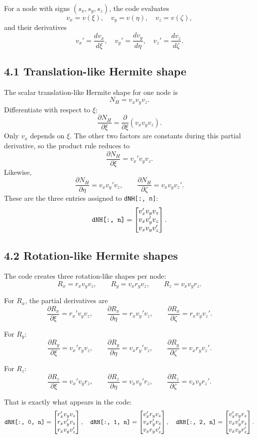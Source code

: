 \documentclass[11pt]{article}
\newcommand{\pd}[2]{\frac{\partial #1}{\partial #2}}
\newcommand{\od}[2]{\frac{d #1}{d #2}}
\begin{document}
For a node with signs $(s_x,s_y,s_z)$, the code evaluates
\[
v_x=v(\xi),\quad v_y=v(\eta),\quad v_z=v(\zeta),
\]
and their derivatives
\[
v_x'=\od{v_x}{\xi},\quad
v_y'=\od{v_y}{\eta},\quad
v_z'=\od{v_z}{\zeta}.
\]

\subsection*{4.1 Translation-like Hermite shape}

The scalar translation-like Hermite shape for one node is
\[
N_H=v_xv_yv_z.
\]
Differentiate with respect to $\xi$:
\[
\pd{N_H}{\xi}
=
\pd{}{\xi}(v_xv_yv_z).
\]
Only $v_x$ depends on $\xi$. The other two factors are constants during this
partial derivative, so the product rule reduces to
\[
\boxed{
\pd{N_H}{\xi}=v_x'v_yv_z
}.
\]
Likewise,
\[
\boxed{
\pd{N_H}{\eta}=v_xv_y'v_z
},
\qquad
\boxed{
\pd{N_H}{\zeta}=v_xv_yv_z'
}.
\]
These are the three entries assigned to \texttt{dNH[:, n]}:
\[
\text{\texttt{dNH[:, n]}}=
\begin{bmatrix}
v_x'v_yv_z\\
v_xv_y'v_z\\
v_xv_yv_z'
\end{bmatrix}.
\]

\subsection*{4.2 Rotation-like Hermite shapes}

The code creates three rotation-like shapes per node:
\[
R_x=r_xv_yv_z,\qquad
R_y=v_xr_yv_z,\qquad
R_z=v_xv_yr_z.
\]

For $R_x$, the partial derivatives are
\[
\boxed{
\pd{R_x}{\xi}=r_x'v_yv_z
},
\qquad
\boxed{
\pd{R_x}{\eta}=r_xv_y'v_z
},
\qquad
\boxed{
\pd{R_x}{\zeta}=r_xv_yv_z'
}.
\]

For $R_y$:
\[
\boxed{
\pd{R_y}{\xi}=v_x'r_yv_z
},
\qquad
\boxed{
\pd{R_y}{\eta}=v_xr_y'v_z
},
\qquad
\boxed{
\pd{R_y}{\zeta}=v_xr_yv_z'
}.
\]

For $R_z$:
\[
\boxed{
\pd{R_z}{\xi}=v_x'v_yr_z
},
\qquad
\boxed{
\pd{R_z}{\eta}=v_xv_y'r_z
},
\qquad
\boxed{
\pd{R_z}{\zeta}=v_xv_yr_z'
}.
\]

That is exactly what appears in the code:
\[
\text{\texttt{dRH[:, 0, n]}}=
\begin{bmatrix}
r_x'v_yv_z\\
r_xv_y'v_z\\
r_xv_yv_z'
\end{bmatrix},
\quad
\text{\texttt{dRH[:, 1, n]}}=
\begin{bmatrix}
v_x'r_yv_z\\
v_xr_y'v_z\\
v_xr_yv_z'
\end{bmatrix},
\quad
\text{\texttt{dRH[:, 2, n]}}=
\begin{bmatrix}
v_x'v_yr_z\\
v_xv_y'r_z\\
v_xv_yr_z'
\end{bmatrix}.
\]
\end{document}
